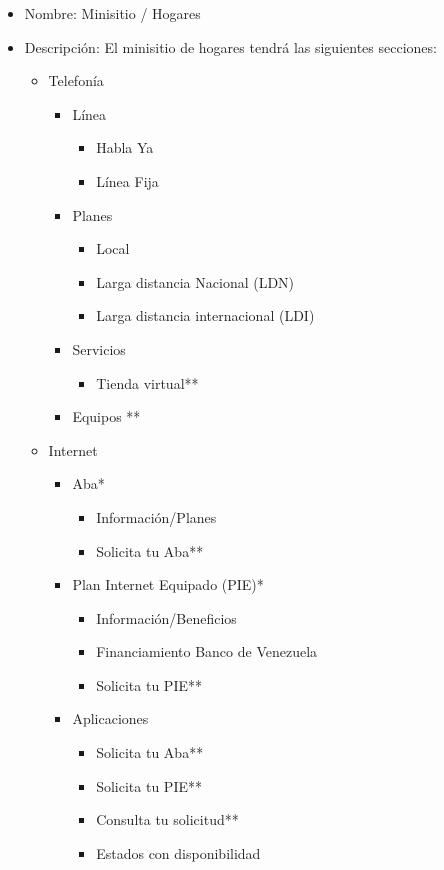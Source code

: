 \documentclass[11pt, letterpaper, oneside, spanish]{scrbook}
\begin{document}
\begin{itemize}
\item Nombre: Minisitio / Hogares
\item Descripción: El minisitio de hogares tendrá las siguientes secciones:
\begin{itemize}
\item Telefonía
\begin{itemize}
\item Línea
\begin{itemize}
\item Habla Ya
\item Línea Fija
\end{itemize}
\item Planes
\begin{itemize}
\item Local
\item Larga distancia Nacional (LDN)
\item Larga distancia internacional (LDI)
\end{itemize}
\item Servicios
\begin{itemize}
\item Tienda virtual**
\end{itemize}
\item Equipos **
\end{itemize}
\item Internet
\begin{itemize}
\item Aba*
\begin{itemize}
\item Información/Planes
\item Solicita tu Aba**
\end{itemize}
\item Plan Internet Equipado (PIE)*
\begin{itemize}
\item Información/Beneficios
\item Financiamiento Banco de Venezuela
\item Solicita tu PIE**
\end{itemize}
\item Aplicaciones
\begin{itemize}
\item Solicita tu Aba**
\item Solicita tu PIE**
\item Consulta tu solicitud**
\item Estados con disponibilidad
\end{itemize}

\end{itemize}
\end{itemize}
\end{itemize}
\end{document}

